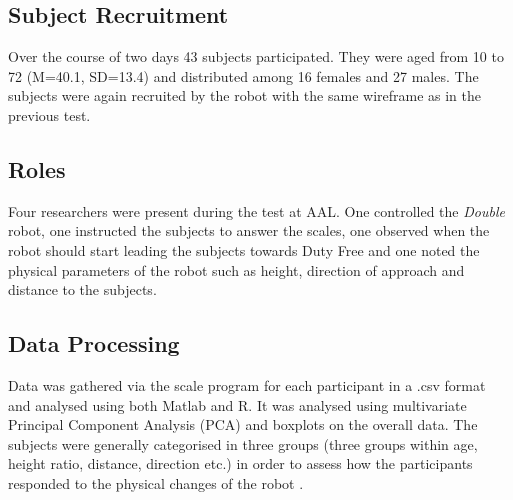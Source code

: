 \subsection{Subject Recruitment}
Over the course of two days 43 subjects participated. They were aged from 10 to 72 (M=40.1, SD=13.4) and distributed among 16 females and 27 males. The subjects were again recruited by the robot with the same wireframe as in the previous test.

\subsection{Roles}
Four researchers were present during the test at AAL. One controlled the \textit{Double} robot, one instructed the subjects to answer the scales, one observed when the robot should start leading the subjects towards Duty Free and one noted the physical parameters of the robot such as height, direction of approach and distance to the subjects.

\subsection{Data Processing}
Data was gathered via the scale program for each participant in a .csv format and analysed using both Matlab and R. It was analysed using multivariate Principal Component Analysis (PCA) and boxplots on the overall data. The subjects were generally categorised in three groups (three groups within age, height ratio, distance, direction etc.) in order to assess how the participants responded to the physical changes of the robot .